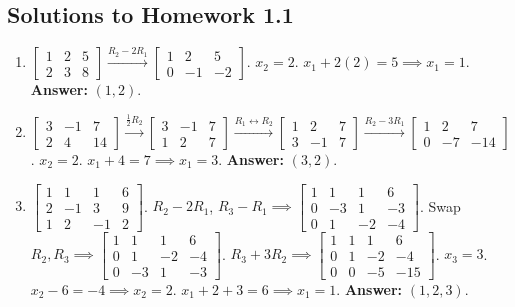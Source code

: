 \documentclass[11pt]{article}
\begin{document}
\subsection{Solutions to Homework 1.1}
\begin{enumerate}[label=\textbf{Sol 1.1.\arabic*}]
    \item $\left[\begin{array}{cc|c} 1 & 2 & 5 \\ 2 & 3 & 8 \end{array}\right] \xrightarrow{R_2 - 2R_1} \left[\begin{array}{cc|c} 1 & 2 & 5 \\ 0 & -1 & -2 \end{array}\right]$. $x_2 = 2$. $x_1 + 2(2) = 5 \implies x_1 = 1$. \textbf{Answer:} $(1, 2)$.
    \item $\left[\begin{array}{cc|c} 3 & -1 & 7 \\ 2 & 4 & 14 \end{array}\right] \xrightarrow{\frac{1}{2}R_2} \left[\begin{array}{cc|c} 3 & -1 & 7 \\ 1 & 2 & 7 \end{array}\right] \xrightarrow{R_1 \leftrightarrow R_2} \left[\begin{array}{cc|c} 1 & 2 & 7 \\ 3 & -1 & 7 \end{array}\right] \xrightarrow{R_2 - 3R_1} \left[\begin{array}{cc|c} 1 & 2 & 7 \\ 0 & -7 & -14 \end{array}\right]$. $x_2 = 2$. $x_1 + 4 = 7 \implies x_1 = 3$. \textbf{Answer:} $(3, 2)$.
    \item $\left[\begin{array}{ccc|c} 1 & 1 & 1 & 6 \\ 2 & -1 & 3 & 9 \\ 1 & 2 & -1 & 2 \end{array}\right]$. $R_2-2R_1$, $R_3-R_1 \implies \left[\begin{array}{ccc|c} 1 & 1 & 1 & 6 \\ 0 & -3 & 1 & -3 \\ 0 & 1 & -2 & -4 \end{array}\right]$. Swap $R_2, R_3 \implies \left[\begin{array}{ccc|c} 1 & 1 & 1 & 6 \\ 0 & 1 & -2 & -4 \\ 0 & -3 & 1 & -3 \end{array}\right]$. $R_3+3R_2 \implies \left[\begin{array}{ccc|c} 1 & 1 & 1 & 6 \\ 0 & 1 & -2 & -4 \\ 0 & 0 & -5 & -15 \end{array}\right]$. $x_3 = 3$. $x_2 - 6 = -4 \implies x_2 = 2$. $x_1 + 2 + 3 = 6 \implies x_1 = 1$. \textbf{Answer:} $(1, 2, 3)$.

\end{enumerate}
\end{document}
